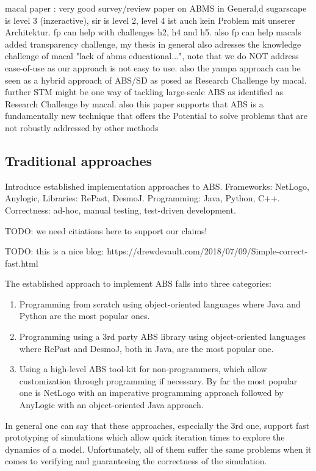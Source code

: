 macal paper \cite{macal_everything_2016}: very good survey/review paper on ABMS in General,d sugarscape is level 3 (inzeractive), sir is level 2, level 4 ist auch kein Problem mit unserer Architektur. fp can help with challenges h2, h4 and h5. also fp can help macals added transparency challenge, my thesis in general also adresses the knowledge challenge of macal "lack of abms educational...", note that we do NOT address ease-of-use as our approach is not easy to use. also the yampa approach can be seen as a hybrid approach of ABS/SD as posed as Research Challenge by macal. further STM might be one way of tackling large-scale ABS as identified as Research Challenge by macal. also this paper supports that ABS is a fundamentally new technique that offers the Potential to solve problems that are not robustly addressed by other methods

\subsection{Traditional approaches}
Introduce established implementation approaches to ABS. Frameworks: NetLogo, Anylogic, Libraries: RePast, DesmoJ. Programming: Java, Python, C++. Correctness: ad-hoc, manual testing, test-driven development.

TODO: we need citiations here to support our claims!

TODO: this is a nice blog: https://drewdevault.com/2018/07/09/Simple-correct-fast.html

The established approach to implement ABS falls into three categories:
\begin{enumerate}
	\item Programming from scratch using object-oriented languages where Java and Python are the most popular ones.
	\item Programming using a 3rd party ABS library using object-oriented languages where RePast and DesmoJ, both in Java, are the most popular one.
	\item Using a high-level ABS tool-kit for non-programmers, which allow customization through programming if necessary. By far the most popular one is NetLogo with an imperative programming approach followed by AnyLogic with an object-oriented Java approach.
\end{enumerate}

In general one can say that these approaches, especially the 3rd one, support fast prototyping of simulations which allow quick iteration times to explore the dynamics of a model. Unfortunately, all of them suffer the same problems when it comes to verifying and guaranteeing the correctness of the simulation.

